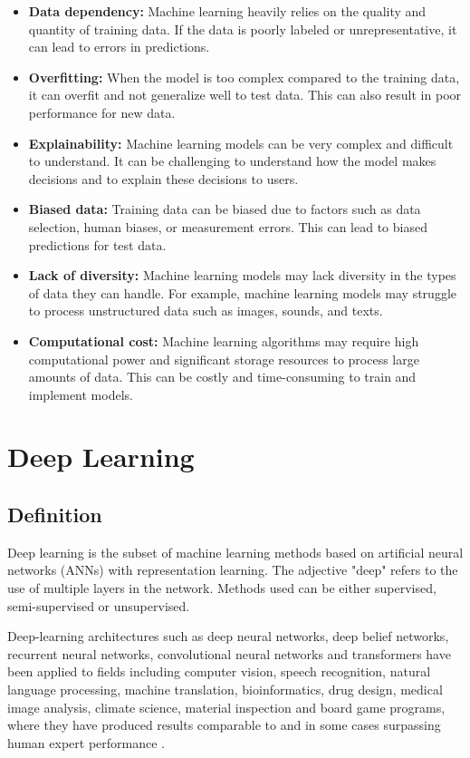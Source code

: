 \begin{itemize}
    \item{\textbf{Data dependency:} Machine learning heavily relies on the quality and quantity of training data. If the data is poorly labeled or unrepresentative, it can lead to errors in predictions.}
    \item{\textbf{Overfitting:} When the model is too complex compared to the training data, it can overfit and not generalize well to test data. This can also result in poor performance for new data.}
    \item{\textbf{Explainability:} Machine learning models can be very complex and difficult to understand. It can be challenging to understand how the model makes decisions and to explain these decisions to users.}
    \item{\textbf{Biased data:} Training data can be biased due to factors such as data selection, human biases, or measurement errors. This can lead to biased predictions for test data.}
    \item{\textbf{Lack of diversity:} Machine learning models may lack diversity in the types of data they can handle. For example, machine learning models may struggle to process unstructured data such as images, sounds, and texts.}
    \item{\textbf{Computational cost:} Machine learning algorithms may require high computational power and significant storage resources to process large amounts of data. This can be costly and time-consuming to train and implement models.}
\end{itemize}


\section{Deep Learning}

\subsection{Definition}

Deep learning is the subset of machine learning methods based on artificial neural networks (ANNs) with representation learning. The adjective "deep" refers to the use of multiple layers in the network. Methods used can be either supervised, semi-supervised or unsupervised.

Deep-learning architectures such as deep neural networks, deep belief networks, recurrent neural networks, convolutional neural networks and transformers have been applied to fields including computer vision, speech recognition, natural language processing, machine translation, bioinformatics, drug design, medical image analysis, climate science, material inspection and board game programs, where they have produced results comparable to and in some cases surpassing human expert performance \cite{enwiki:1220437155}.

